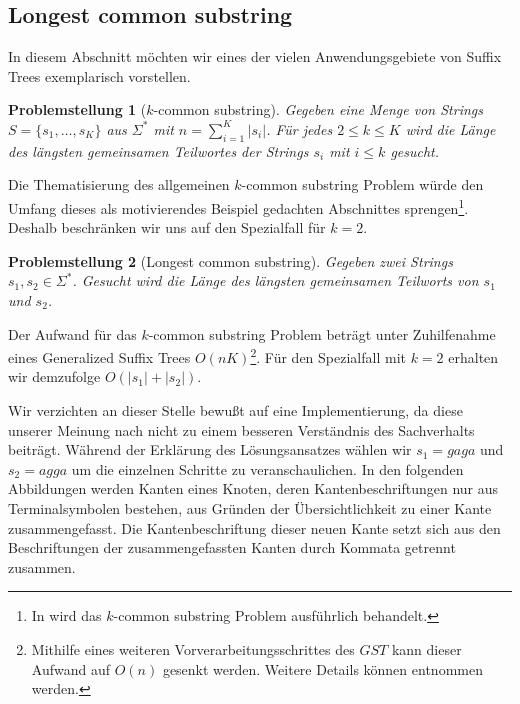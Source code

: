 \documentclass[12pt]{report}
\newtheorem*{problem}{Problemstellung}
\newcommand{\abs}[1]{\left|#1\right|}
\begin{document}
\subsection{Longest common substring}
\label{sec:LongestCommonSubstring}

In diesem Abschnitt möchten wir eines der vielen Anwendungsgebiete von Suffix Trees exemplarisch vorstellen.

\begin{problem}[$k$-common substring]
Gegeben eine Menge von Strings $S = \{s_1, \dots, s_K\}$ aus $\Sigma^*$ mit $n = \sum_{i = 1}^K \abs{s_i}$. Für jedes $2 \leq k \leq K$ wird die Länge des längsten gemeinsamen Teilwortes der Strings $s_i$ mit $i \leq k$ gesucht.
\end{problem}

Die Thematisierung des allgemeinen $k$-common substring Problem würde den Umfang dieses als motivierendes Beispiel gedachten Abschnittes sprengen\footnote{In \cite{Gusfield1997} wird das $k$-common substring Problem ausführlich behandelt.}. Deshalb beschränken wir uns auf den Spezialfall für $k = 2$.

\begin{problem}[Longest common substring]
Gegeben zwei Strings $s_1, s_2 \in \Sigma^*$. Gesucht wird die Länge des längsten gemeinsamen Teilworts von $s_1$ und $s_2$.
\end{problem}

Der Aufwand für das $k$-common substring Problem beträgt unter Zuhilfenahme eines Generalized Suffix Trees $O(nK)$\footnote{Mithilfe eines weiteren Vorverarbeitungsschrittes des $GST$ kann dieser Aufwand auf $O(n)$ gesenkt werden. Weitere Details können \cite{Gusfield1997} entnommen werden.}. Für den Spezialfall mit $k = 2$ erhalten wir demzufolge $O(\abs{s_1} + \abs{s_2})$.

Wir verzichten an dieser Stelle bewußt auf eine Implementierung, da diese unserer Meinung nach nicht zu einem besseren Verständnis des Sachverhalts beiträgt. Während der Erklärung des Lösungsansatzes wählen wir $s_1 = gaga$ und $s_2 = agga$ um die einzelnen Schritte zu veranschaulichen. In den folgenden Abbildungen werden Kanten eines Knoten, deren Kantenbeschriftungen nur aus Terminalsymbolen bestehen, aus Gründen der Übersichtlichkeit zu einer Kante zusammengefasst. Die Kantenbeschriftung dieser neuen Kante setzt sich aus den Beschriftungen der zusammengefassten Kanten durch Kommata getrennt zusammen.
\end{document}
